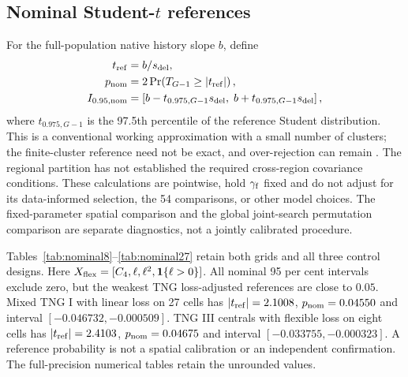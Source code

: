 \documentclass[11pt,a4paper]{article}
\begin{document}
\FloatBarrier
\subsection{Nominal Student-$t$ references}\label{supp:nominal_t}
For the full-population native history slope $b$, define
\begin{align}
t_{\rm ref}&=b/s_{\rm del},\\
p_{\rm nom}&=2\Pr\!\left(T_{G-1}\geq |t_{\rm ref}|\right),\\
I_{0.95,\rm nom}&=\left[b-t_{0.975,G-1}s_{\rm del},\;b+t_{0.975,G-1}s_{\rm del}\right],
\end{align}
where $t_{0.975,G-1}$ is the 97.5th percentile of the reference Student distribution. This is a conventional working approximation with a small number of clusters; the finite-cluster reference need not be exact, and over-rejection can remain \citep{CameronMiller2015,MacKinnon2023}. The regional partition has not established the required cross-region covariance conditions. These calculations are pointwise, hold $\gamma_{\rm f}$ fixed and do not adjust for its data-informed selection, the 54 comparisons, or other model choices. The fixed-parameter spatial comparison and the global joint-search permutation comparison are separate diagnostics, not a jointly calibrated procedure.

Tables~\ref{tab:nominal8}--\ref{tab:nominal27} retain both grids and all three control designs. Here $X_{\rm flex}=[C_4,\ell,\ell^2,\mathbf1\{\ell>0\}]$. All nominal 95 per cent intervals exclude zero, but the weakest TNG loss-adjusted references are close to $0.05$. Mixed TNG I with linear loss on 27 cells has $|t_{\rm ref}|=2.1008$, $p_{\rm nom}=0.04550$ and interval $[-0.046732,-0.000509]$. TNG III centrals with flexible loss on eight cells has $|t_{\rm ref}|=2.4103$, $p_{\rm nom}=0.04675$ and interval $[-0.033755,-0.000323]$. A reference probability is not a spatial calibration or an independent confirmation. The full-precision numerical tables retain the unrounded values.

\begin{table}[p]\centering\footnotesize\setlength{\tabcolsep}{3pt}

\caption{Eight-cell nominal spatial references ($G-1=7$ reference degrees of freedom). The interval is for the native history slope at the fixed fiducial weighting parameter. Values assume the stated Student reference and are neither search-adjusted nor multiplicity-adjusted. Cross-region independence and small-cluster calibration are not established.}\label{tab:nominal8}
\end{table}
\begin{table}[p]\centering\footnotesize\setlength{\tabcolsep}{3pt}

\caption{Twenty-seven-cell nominal spatial references ($G-1=26$ reference degrees of freedom). Definitions and qualifications are identical to Table~\ref{tab:nominal8}. Reporting both grids avoids selecting a more favourable partition; it does not supply a multiple-comparison correction.}\label{tab:nominal27}
\end{table}
\FloatBarrier
\end{document}
